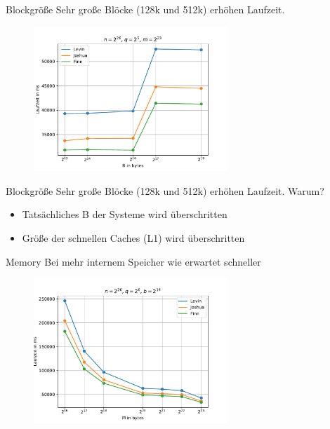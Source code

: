 \documentclass[ngerman,aspectratio=169,10pt]{beamer}
\begin{document}
\begin{frame}{Blockgröße}
Sehr große Blöcke (128k und 512k) erhöhen Laufzeit.
\begin{figure}[H]
    \centering
    \includegraphics[width=0.65\textwidth]{Figure_1.pdf}
    \label{fig:Figure1}
\end{figure}
\end{frame}

\begin{frame}{Blockgröße}
Sehr große Blöcke (128k und 512k) erhöhen Laufzeit. Warum?
\begin{itemize}
    \item Tatsächliches B der Systeme wird überschritten
    \item Größe der schnellen Caches (L1) wird überschritten
\end{itemize}
\end{frame}

\begin{frame}{Memory}
Bei mehr internem Speicher wie erwartet schneller
\begin{figure}[H]
    \centering
    \includegraphics[width=0.65\textwidth]{m__n_67108864_q_64_b_16384.pdf}
    \label{fig:f1}
\end{figure}
\end{frame}
\end{document}

